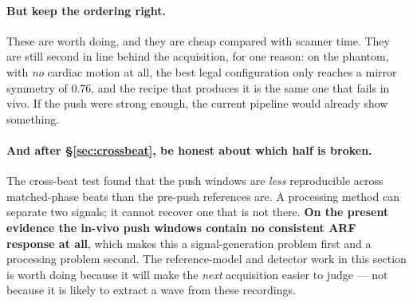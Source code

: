 \documentclass[11pt,a4paper]{article}
\newcommand{\bad}[1]{\textcolor{red!65!black}{\textbf{#1}}}
\begin{document}
\paragraph{But keep the ordering right.} These are worth doing, and they are cheap compared with
scanner time. They are still second in line behind the acquisition, for one reason: on the phantom,
with \emph{no} cardiac motion at all, the best legal configuration only reaches a mirror symmetry of
0.76, and the recipe that produces it is the same one that fails in vivo. If the push were strong
enough, the current pipeline would already show something.

\paragraph{And after \S\ref{sec:crossbeat}, be honest about which half is broken.} The
cross-beat test found that the push windows are \emph{less} reproducible across matched-phase beats
than the pre-push references are. A processing method can separate two signals; it cannot recover
one that is not there. \bad{On the present evidence the in-vivo push windows contain no consistent
ARF response at all}, which makes this a signal-generation problem first and a processing problem
second. The reference-model and detector work in this section is worth doing because it will make
the \emph{next} acquisition easier to judge --- not because it is likely to extract a wave from
these recordings.

\end{document}
